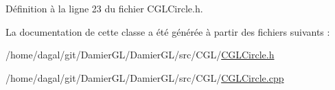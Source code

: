 Définition à la ligne 23 du fichier C\-G\-L\-Circle.\-h.



La documentation de cette classe a été générée à partir des fichiers suivants \-:\begin{DoxyCompactItemize}
\item 
/home/dagal/git/\-Damier\-G\-L/\-Damier\-G\-L/src/\-C\-G\-L/\hyperlink{_c_g_l_circle_8h}{C\-G\-L\-Circle.\-h}\item 
/home/dagal/git/\-Damier\-G\-L/\-Damier\-G\-L/src/\-C\-G\-L/\hyperlink{_c_g_l_circle_8cpp}{C\-G\-L\-Circle.\-cpp}\end{DoxyCompactItemize}
